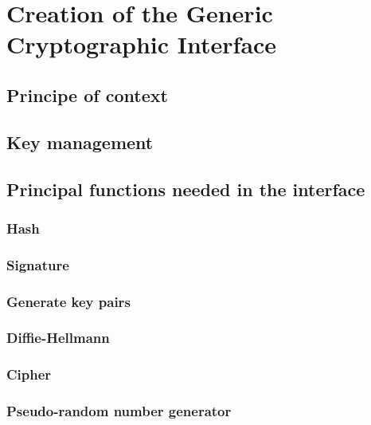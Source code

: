 \chapter{Creation of the Generic Cryptographic Interface}

\section{Principe of context}

\section{Key management}

\section{Principal functions needed in the interface}

\subsection{Hash}

\subsection{Signature}

\subsection{Generate key pairs}

\subsection{Diffie-Hellmann}

\subsection{Cipher}

\subsection{Pseudo-random number generator}